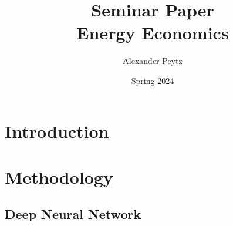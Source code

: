 \documentclass[10pt,a4paper]{article}
\title{Seminar Paper\\ Energy Economics}
\author{Alexander Peytz}
\date{\vspace{-8ex}}
\date{Spring 2024}
\numberwithin{equation}{section} %
\begin{document}
\maketitle

\tableofcontents
\newpage
% 
\section{Introduction}
\newpage
\section{Methodology}
\subsection{Deep Neural Network}
\end{document}
